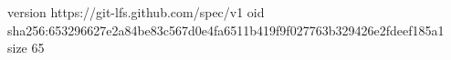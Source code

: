 version https://git-lfs.github.com/spec/v1
oid sha256:653296627e2a84be83c567d0e4fa6511b419f9f027763b329426e2fdeef185a1
size 65
